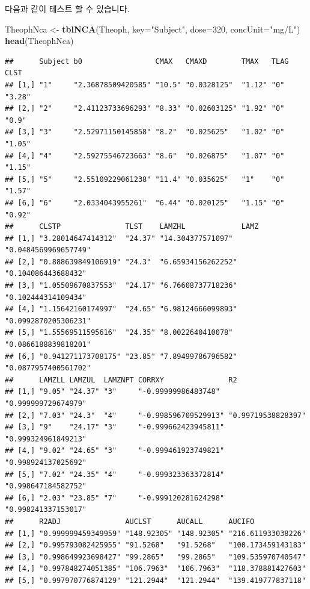 \documentclass[12pt,]{krantz}
\newenvironment{Shaded}{\begin{snugshade}}{\end{snugshade}}
\newcommand{\KeywordTok}[1]{\textcolor[rgb]{0.13,0.29,0.53}{\textbf{#1}}}
\newcommand{\DataTypeTok}[1]{\textcolor[rgb]{0.13,0.29,0.53}{#1}}
\newcommand{\DecValTok}[1]{\textcolor[rgb]{0.00,0.00,0.81}{#1}}
\newcommand{\StringTok}[1]{\textcolor[rgb]{0.31,0.60,0.02}{#1}}
\newcommand{\NormalTok}[1]{#1}
\theoremstyle{definition}
\theoremstyle{definition}
\theoremstyle{definition}
\theoremstyle{remark}
\begin{document}
다음과 같이 테스트 할 수 있습니다.

\begin{Shaded}
\begin{Highlighting}[]
\NormalTok{TheophNca <-}\StringTok{ }\KeywordTok{tblNCA}\NormalTok{(Theoph, }\DataTypeTok{key=}\StringTok{"Subject"}\NormalTok{, }\DataTypeTok{dose=}\DecValTok{320}\NormalTok{, }\DataTypeTok{concUnit=}\StringTok{"mg/L"}\NormalTok{)}
\KeywordTok{head}\NormalTok{(TheophNca)}
\end{Highlighting}
\end{Shaded}

\begin{verbatim}
##      Subject b0                 CMAX   CMAXD        TMAX   TLAG CLST  
## [1,] "1"     "2.36878509420585" "10.5" "0.0328125"  "1.12" "0"  "3.28"
## [2,] "2"     "2.41123733696293" "8.33" "0.02603125" "1.92" "0"  "0.9" 
## [3,] "3"     "2.52971150145858" "8.2"  "0.025625"   "1.02" "0"  "1.05"
## [4,] "4"     "2.59275546723663" "8.6"  "0.026875"   "1.07" "0"  "1.15"
## [5,] "5"     "2.55109229061238" "11.4" "0.035625"   "1"    "0"  "1.57"
## [6,] "6"     "2.0334043955261"  "6.44" "0.020125"   "1.15" "0"  "0.92"
##      CLSTP               TLST    LAMZHL             LAMZ                
## [1,] "3.28014647414312"  "24.37" "14.304377571097"  "0.0484569969657749"
## [2,] "0.888639849106919" "24.3"  "6.65934156262252" "0.104086443688432" 
## [3,] "1.05509670837553"  "24.17" "6.76608737718236" "0.102444314109434" 
## [4,] "1.15642160174997"  "24.65" "6.98124666099893" "0.0992870205306231"
## [5,] "1.55569511595616"  "24.35" "8.0022640410078"  "0.0866188839818201"
## [6,] "0.941271173708175" "23.85" "7.89499786796582" "0.0877957400561702"
##      LAMZLL LAMZUL  LAMZNPT CORRXY               R2                 
## [1,] "9.05" "24.37" "3"     "-0.99999986483748"  "0.999999729674979"
## [2,] "7.03" "24.3"  "4"     "-0.998596709529913" "0.99719538828397" 
## [3,] "9"    "24.17" "3"     "-0.999662423945811" "0.999324961849213"
## [4,] "9.02" "24.65" "3"     "-0.999461923749821" "0.998924137025692"
## [5,] "7.02" "24.35" "4"     "-0.999323363372814" "0.998647184582752"
## [6,] "2.03" "23.85" "7"     "-0.999120281624298" "0.998241337153017"
##      R2ADJ               AUCLST      AUCALL      AUCIFO            
## [1,] "0.999999459349959" "148.92305" "148.92305" "216.611933038226"
## [2,] "0.995793082425955" "91.5268"   "91.5268"   "100.173459143183"
## [3,] "0.998649923698427" "99.2865"   "99.2865"   "109.535970740547"
## [4,] "0.997848274051385" "106.7963"  "106.7963"  "118.378881427603"
## [5,] "0.997970776874129" "121.2944"  "121.2944"  "139.419777837118"

\end{verbatim}
\end{document}
